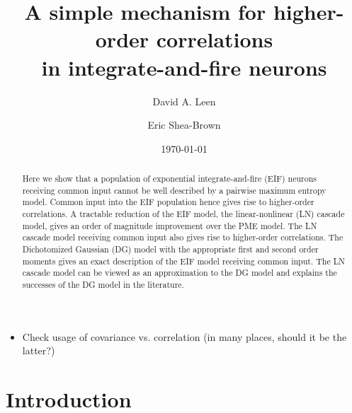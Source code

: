 \documentclass[%
 reprint,
 twocolumn,
 amsmath,amssymb,
 aps,
floatfix,
]{revtex4}
\begin{document}

\title{A simple mechanism for higher-order correlations\\ in integrate-and-fire neurons}%

\author{David A. Leen}

 
\author{Eric Shea-Brown}%

\date{\today}%

\begin{abstract}
Here we show that a population of exponential integrate-and-fire (EIF) neurons receiving common input cannot be well described by a pairwise maximum entropy model. Common input into the EIF population hence gives rise to higher-order correlations. A tractable reduction of the EIF model, the linear-nonlinear (LN) cascade model, gives an order of magnitude improvement over the PME model. The LN cascade model receiving common input also gives rise to higher-order correlations. The Dichotomized Gaussian (DG) model with the appropriate first and second order moments gives an exact description of the EIF model receiving common input. The LN cascade model can be viewed as an approximation to the DG model and explains the successes of the DG model in the literature.
\end{abstract}

\maketitle

\begin{itemize}
\item Check usage of covariance vs. correlation (in many places, should it be the latter?)
\end{itemize}

\section{\label{sec:intro}Introduction}%
\end{document}
